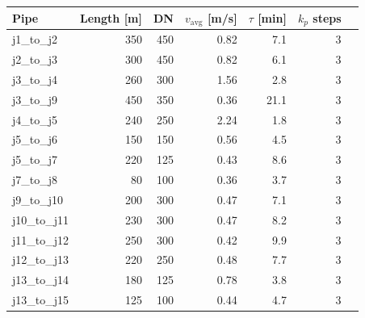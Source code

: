 \begin{tabular}{lrrrrrr}
\toprule
Pipe & Length [m] & DN & $v_\mathrm{avg}$ [m/s] & $\tau$ [min] & $k_p$ steps \\
\midrule
j1_to_j2 & 350 & 450 & 0.82 & 7.1 & 3 \\
j2_to_j3 & 300 & 450 & 0.82 & 6.1 & 3 \\
j3_to_j4 & 260 & 300 & 1.56 & 2.8 & 3 \\
j3_to_j9 & 450 & 350 & 0.36 & 21.1 & 3 \\
j4_to_j5 & 240 & 250 & 2.24 & 1.8 & 3 \\
j5_to_j6 & 150 & 150 & 0.56 & 4.5 & 3 \\
j5_to_j7 & 220 & 125 & 0.43 & 8.6 & 3 \\
j7_to_j8 & 80 & 100 & 0.36 & 3.7 & 3 \\
j9_to_j10 & 200 & 300 & 0.47 & 7.1 & 3 \\
j10_to_j11 & 230 & 300 & 0.47 & 8.2 & 3 \\
j11_to_j12 & 250 & 300 & 0.42 & 9.9 & 3 \\
j12_to_j13 & 220 & 250 & 0.48 & 7.7 & 3 \\
j13_to_j14 & 180 & 125 & 0.78 & 3.8 & 3 \\
j13_to_j15 & 125 & 100 & 0.44 & 4.7 & 3 \\
\bottomrule
\end{tabular}
